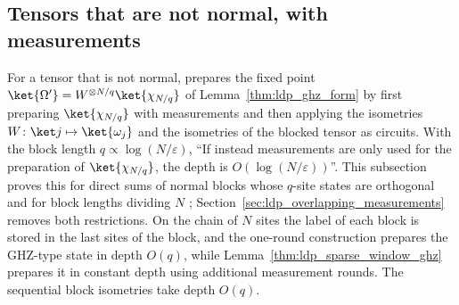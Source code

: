 
\subsection{Tensors that are not normal, with measurements}
\label{sec:ldp_long_range_measurements}

For a tensor that is not normal, \cite{Malz2024Preparation} prepares the
fixed point $\ket{\Omega'}=W^{\otimes N/q}\ket{\chi_{N/q}}$ of
Lemma~\ref{thm:ldp_ghz_form} by first preparing $\ket{\chi_{N/q}}$ with
measurements and then applying the isometries
$W\colon\ket j\mapsto\ket{\omega_j}$ and the isometries of the blocked tensor
as circuits. With the block length $q\propto\log(N/\varepsilon)$, ``If instead
measurements are only used for the preparation of $\ket{\chi_{N/q}}$, the depth
is $O(\log(N/\varepsilon))$''. This subsection proves this for direct sums of
normal blocks whose $q$-site states are orthogonal and for block lengths
dividing $N$ \cite{gap:mswc24_measurement_preparation_scope};
Section~\ref{sec:ldp_overlapping_measurements} removes both restrictions. On the chain of
$N$ sites the label of each block is stored in the last sites of the block, and
the one-round construction prepares the GHZ-type state in depth $O(q)$,
while Lemma~\ref{thm:ldp_sparse_window_ghz} prepares it in constant depth
using additional measurement rounds. The sequential block isometries take
depth $O(q)$.

